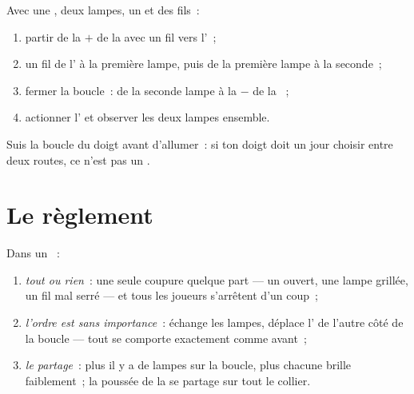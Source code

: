 \begin{method}[Le construire]\label{met:g4:series-circuits:build}
Avec une , deux lampes, un  et des fils~:
\begin{enumerate}
  \item partir de la  $+$ de la  avec un fil vers
        l'~;
  \item un fil de l' à la première lampe, puis de la
        première lampe à la seconde~;
  \item fermer la boucle~: de la seconde lampe à la  $-$ de la
        ~;
  \item actionner l' et observer les deux lampes
        ensemble.
\end{enumerate}
Suis la boucle du doigt avant d'allumer~: si ton doigt doit un jour
choisir entre deux routes, ce n'est pas un .
\end{method}

\section{Le règlement}

\begin{proposition}\label{prop:g4:series-circuits:rules}
Dans un ~:
\begin{enumerate}
  \item \emph{tout ou rien}~: une seule coupure quelque part --- un
         ouvert, une lampe grillée, un fil mal serré ---
        et tous les joueurs s'arrêtent d'un coup~;
  \item \emph{l'ordre est sans importance}~: échange les lampes,
        déplace l' de l'autre côté de la boucle --- tout
        se comporte exactement comme avant~;
  \item \emph{le partage}~: plus il y a de lampes sur la boucle,
        plus chacune brille faiblement~; la poussée de la  se
        partage sur tout le collier.
\end{enumerate}
\end{proposition}

